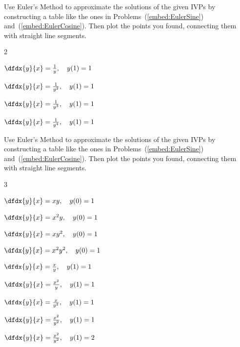   \begin{embeddedproblem}
    Use Euler's Method to approximate the solutions of the given IVPs
    by constructing a table like the ones in
    Problems~(\ref{embed:EulerSine})
    and~(\ref{embed:EulerCosine}). Then plot the points you found,
    connecting them with straight line segments.
    \begin{enumerate}[label={\bf{}(\alph*)}]
      \begin{multicols}{2}
      \item $\dfdx{y}{x}=\frac{1}{y},\ \ \ y(1)=1$
      \item $\dfdx{y}{x}=\frac{1}{y^2},\ \ \ y(1)=1$
      \item $\dfdx{y}{x}=\frac{1}{y^3},\ \ \ y(1)=1$
      \item $\dfdx{y}{x}=\frac{1}{y^4},\ \ \ y(1)=1$ 
      \end{multicols}
    \end{enumerate}
  \end{embeddedproblem}

  \begin{embeddedproblem}{}
    Use Euler's Method to approximate the solutions of the given IVPs
    by constructing a table like the ones in
    Problems~(\ref{embed:EulerSine})
    and~(\ref{embed:EulerCosine}). Then plot the points you found,
    connecting them with straight line segments.
    \begin{enumerate}[label={\bf{}(\alph*)}]
      \begin{multicols}{3}
      \item $\dfdx{y}{x}=xy,\ \ \ y(0)=1$
      \item $\dfdx{y}{x}=x^2y,\ \ \ y(0)=1$
      \item $\dfdx{y}{x}=xy^2,\ \ \ y(0)=1$
      \item $\dfdx{y}{x}=x^2y^2,\ \ \ y(0)=1$ 
      \item $\dfdx{y}{x}=\frac{x}{y},\ \ \ y(1)=1$
      \item $\dfdx{y}{x}=\frac{x^2}{y},\ \ \ y(1)=1$
      \item $\dfdx{y}{x}=\frac{x}{y^2},\ \ \ y(1)=1$
      \item $\dfdx{y}{x}=\frac{x^2}{y^2},\ \ \ y(1)=1$
      \item $\dfdx{y}{x}=\frac{x^2}{y^2},\ \ \ y(1)=2$
      \end{multicols}
    \end{enumerate}
  \end{embeddedproblem}    

